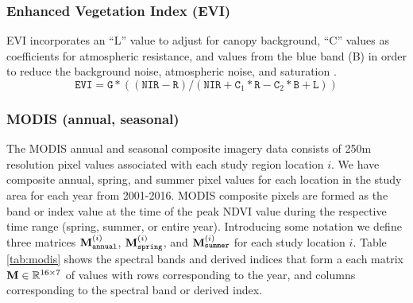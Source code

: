 \def\year{2017}\relax \documentclass[letterpaper]{article}
\begin{document}
\subsubsection{Enhanced Vegetation Index (EVI)}
EVI incorporates an “L” value to adjust for canopy background, “C” values as
coefficients for atmospheric resistance, and values from the blue band (B) in order to reduce the background noise, atmospheric noise, and saturation \cite{usgs2014landsat}.
\begin{equation}
\texttt{EVI} = \texttt{G} * ((\texttt{NIR} - \texttt{R}) / (\texttt{NIR} + \texttt{C}_1 * \texttt{R} - \texttt{C}_2 * \texttt{B} + \texttt{L}))
\end{equation}
\subsubsection{MODIS (annual, seasonal)} 
The MODIS annual and seasonal composite imagery data consists of 250m resolution pixel values associated with each study region location $i$. We have composite annual, spring, and summer pixel values for each location in the study area for each year from 2001-2016.  MODIS composite pixels are formed as the band or index value at the time of the peak NDVI value during the respective time range (spring, summer, or entire year).
Introducing some notation we define three matrices ${\bf M}_{\texttt{annual}}^{(i)}$, ${\bf M}_{\texttt{spring}}^{(i)}$, and ${\bf M}_{\texttt{summer}}^{(i)}$ for each study location $i$. Table \ref{tab:modis} shows the spectral bands and derived indices that form a each matrix  ${\bf M} \in \mathbb{R}^{16\times 7}$ of values with rows corresponding to the year, and columns corresponding to the spectral band or derived index. 
\end{document}

